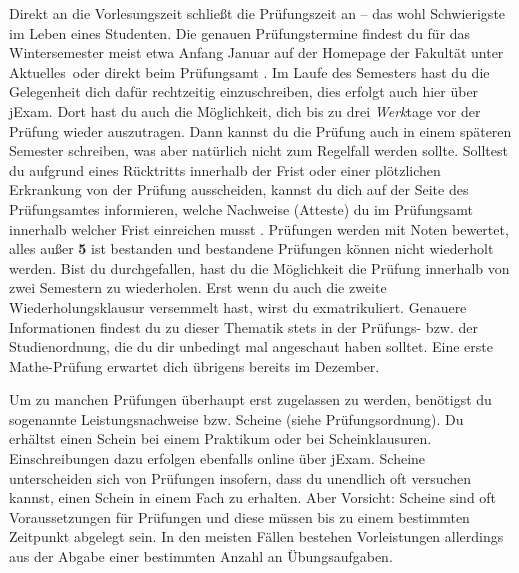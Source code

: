 
Direkt an die Vorlesungszeit schließt die Prüfungszeit an – das wohl Schwierigste im Leben eines Studenten.
Die genauen Prüfungstermine findest du für das Wintersemester meist etwa Anfang Januar auf der Homepage der Fakultät  unter \glqq Aktuelles\grqq\ oder direkt beim Prüfungsamt .
Im Laufe des Semesters hast du die Gelegenheit dich dafür rechtzeitig einzuschreiben, dies erfolgt auch hier über jExam.
Dort hast du auch die Möglichkeit, dich bis zu drei \emph{Werk}tage vor der Prüfung wieder auszutragen. Dann kannst du die Prüfung auch in einem späteren Semester schreiben, was aber natürlich nicht zum Regelfall werden sollte.
Solltest du aufgrund eines Rücktritts innerhalb der Frist oder einer plötzlichen Erkrankung von der Prüfung ausscheiden, kannst du dich auf der Seite des Prüfungsamtes informieren, welche Nachweise (Atteste) du im Prüfungsamt innerhalb welcher Frist einreichen musst .
Prüfungen werden mit Noten bewertet, alles außer \textbf{5} ist bestanden und bestandene Prüfungen können nicht wiederholt werden.
Bist du durchgefallen, hast du die Möglichkeit die Prüfung innerhalb von zwei Semestern zu wiederholen. Erst wenn du auch die zweite Wiederholungsklausur versemmelt hast, wirst du exmatrikuliert.
Genauere Informationen findest du zu dieser Thematik stets in der Prüfungs- bzw. der Studienordnung, die du dir unbedingt mal angeschaut haben solltet.
Eine erste Mathe-Prüfung erwartet dich übrigens bereits im Dezember.


Um zu manchen Prüfungen überhaupt erst zugelassen zu werden, benötigst du sogenannte Leistungsnachweise bzw. Scheine (siehe Prüfungsordnung).
Du erhältst einen Schein bei einem Praktikum oder bei Scheinklausuren.
Einschreibungen dazu erfolgen ebenfalls online über jExam.
Scheine unterscheiden sich von Prüfungen insofern, dass du unendlich oft versuchen kannst, einen Schein in einem Fach zu erhalten.
Aber Vorsicht: Scheine sind oft Voraussetzungen für Prüfungen und diese müssen bis zu einem bestimmten Zeitpunkt abgelegt sein.
In den meisten Fällen bestehen Vorleistungen allerdings aus der Abgabe einer bestimmten Anzahl an Übungsaufgaben.

\label{sec:sprachausbildung}

